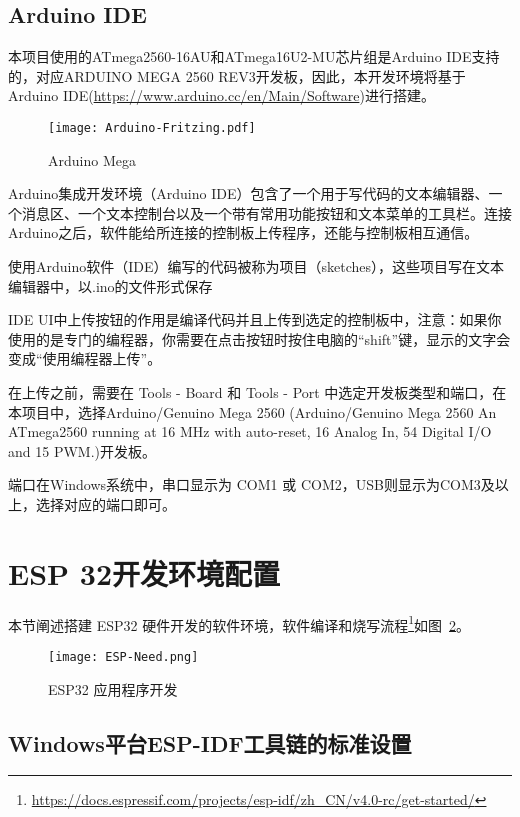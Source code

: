 \subsection{Arduino IDE}

本项目使用的ATmega2560-16AU和ATmega16U2-MU芯片组是Arduino IDE支持的，对应ARDUINO MEGA 2560 REV3开发板，因此，本开发环境将基于Arduino IDE(\url{https://www.arduino.cc/en/Main/Software})进行搭建。

\begin{figure}[htbp]
    \centering
    \texttt{[image: Arduino-Fritzing.pdf]}
    \caption{Arduino Mega}
    \label{fig:Arduino-Fritzing}
\end{figure}

Arduino集成开发环境（Arduino IDE）包含了一个用于写代码的文本编辑器、一个消息区、一个文本控制台以及一个带有常用功能按钮和文本菜单的工具栏。连接Arduino之后，软件能给所连接的控制板上传程序，还能与控制板相互通信。

使用Arduino软件（IDE）编写的代码被称为项目（sketches），这些项目写在文本编辑器中，以.ino的文件形式保存

IDE UI中上传按钮的作用是编译代码并且上传到选定的控制板中，注意：如果你使用的是专门的编程器，你需要在点击按钮时按住电脑的“shift”键，显示的文字会变成“使用编程器上传”。

在上传之前，需要在 Tools - Board 和 Tools - Port 中选定开发板类型和端口，在本项目中，选择Arduino/Genuino Mega 2560 (Arduino/Genuino Mega 2560
An ATmega2560 running at 16 MHz with auto-reset, 16 Analog In, 54 Digital I/O and 15 PWM.)开发板。

端口在Windows系统中，串口显示为 COM1 或 COM2，USB则显示为COM3及以上，选择对应的端口即可。



\section{ESP 32开发环境配置}

本节阐述搭建 ESP32 硬件开发的软件环境，软件编译和烧写流程\footnote{\url{https://docs.espressif.com/projects/esp-idf/zh_CN/v4.0-rc/get-started/}}如图~\ref{fig:ESP-Need}。

\begin{figure}[htbp]
    \centering
    \texttt{[image: ESP-Need.png]}
    \caption{ESP32 应用程序开发}
    \label{fig:ESP-Need}
\end{figure}

\subsection{Windows平台ESP-IDF工具链的标准设置}

